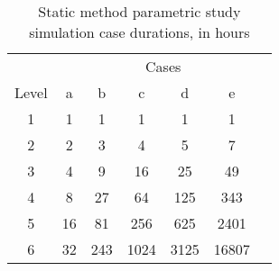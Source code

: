 \documentclass[review,12pt]{elsarticle}
\begin{document}
\begin{table}[htbp!]
\centering
\caption{Static method parametric study simulation case durations, in hours}
\label{tab:static case durations}
\begin{tabular}{ccccccc}
\multicolumn{1}{l}{}     & \multicolumn{6}{c}{Cases}                                                                                                                                                                                                                               \\
Level                    & a                          & b                                             & c                                             & d                                             & e                                             &                            \\ \cline{1-6}
\multicolumn{1}{|c|}{1}  & \multicolumn{1}{c|}{1}     & \multicolumn{1}{c|}{1}                        & \multicolumn{1}{c|}{1}                        & \multicolumn{1}{c|}{1}                        & \multicolumn{1}{c|}{1}                        &                            \\ \cline{1-6}
\multicolumn{1}{|c|}{2}  & \multicolumn{1}{c|}{2}     & \multicolumn{1}{c|}{3}                        & \multicolumn{1}{c|}{4}                        & \multicolumn{1}{c|}{5}                        & \multicolumn{1}{c|}{7}                        &                            \\ \cline{1-6}
\multicolumn{1}{|c|}{3}  & \multicolumn{1}{c|}{4}     & \multicolumn{1}{c|}{9}                        & \multicolumn{1}{c|}{16}                       & \multicolumn{1}{c|}{25}                       & \multicolumn{1}{c|}{49}                       &                            \\ \cline{1-6}
\multicolumn{1}{|c|}{4}  & \multicolumn{1}{c|}{8}     & \multicolumn{1}{c|}{27}                       & \multicolumn{1}{c|}{64}                       & \multicolumn{1}{c|}{125}                      & \multicolumn{1}{c|}{343}                      &                            \\ \cline{1-6}
\multicolumn{1}{|c|}{5}  & \multicolumn{1}{c|}{16}    & \multicolumn{1}{c|}{81}                       & \multicolumn{1}{c|}{256}                      & \multicolumn{1}{c|}{625}                      & \multicolumn{1}{c|}{2401}                     &                            \\ \cline{1-6}
\multicolumn{1}{|c|}{6}  & \multicolumn{1}{c|}{32}    & \multicolumn{1}{c|}{243}                      & \multicolumn{1}{c|}{1024}                     & \multicolumn{1}{c|}{3125}                     & \multicolumn{1}{c|}{16807}                    &                            \\ \cline{1-6}

\end{tabular}
\end{table}
\end{document}
